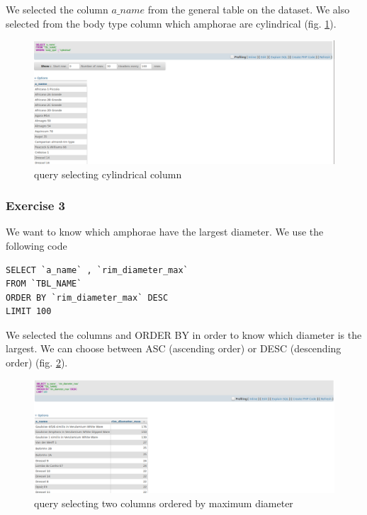 \documentclass[10pt,a4paper]{article}
\begin{document}
We selected the column $a\_name$ from the general table on the dataset. We also selected from the body type column which amphorae are cylindrical (fig. \ref{query2}). 

\begin{figure}[htp]
\centering
\includegraphics[scale=0.30]{query2.png}
\caption{query selecting cylindrical column}
\label{query2}
\end{figure} 


\subsubsection{Exercise 3}

We want to know which amphorae have the largest diameter. We use the following code

\begin{verbatim}
SELECT `a_name` , `rim_diameter_max`
FROM `TBL_NAME`
ORDER BY `rim_diameter_max` DESC
LIMIT 100 
\end{verbatim}

\newpage

We selected the columns and ORDER BY in order to know which diameter is the largest. We can choose between ASC (ascending order) or DESC (descending order) (fig. \ref{query3}).

\begin{figure}[htp]
\centering
\includegraphics[scale=0.30]{query3.png}
\caption{query selecting two columns ordered by maximum diameter}
\label{query3}
\end{figure} 
\end{document}
